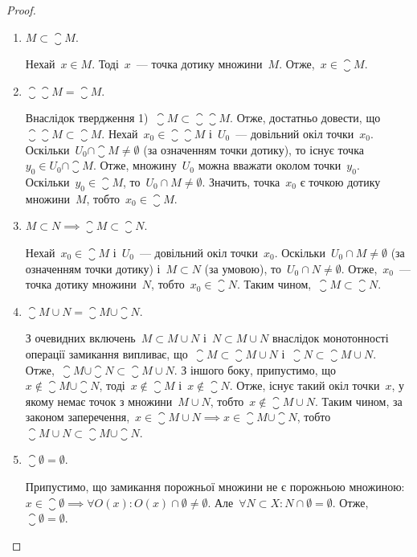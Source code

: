 \begin{proof}
    \listhack
    \begin{enumerate}
        \item $M \subset \closure M$.

        Нехай~$x \in M$. Тоді~$x$~--- точка дотику множини~$M$. Отже,~$x \in \closure M$.
        
        \item $\closure{\closure{M}} = \closure M$.
        
        Внаслідок твердження 1)~$\closure M \subset \closure{\closure{M}}$. Отже, достатньо довести, що~$\closure{\closure{M}} \subset \closure M$. Нехай~$x_0 \in \closure{\closure{M}}$ і~$U_0$~--- довільний окіл точки~$x_0$. Оскільки~$U_0 \cap \closure M \ne \emptyset$ (за означенням точки дотику), то існує точка~$y_0 \in U_0 \cap \closure M$. Отже, множину~$U_0$ можна вважати околом точки~$y_0$. Оскільки~$y_0 \in \closure M$, то~$U_0 \cap M \ne \emptyset$. Значить, точка~$x_0$ є точкою дотику множини~$M$, тобто~$x_0 \in \closure M$.
        
        \item $M \subset N \implies \closure M \subset \closure N$.
        
        Нехай~$x_0 \in \closure M$ і~$U_0$~--- довільний окіл точки~$x_0$. Оскільки~$U_0 \cap M \ne \emptyset$ (за означенням точки дотику) і~$M \subset N$ (за умовою), то~$U_0 \cap N \ne \emptyset$. Отже,~$x_0$~--- точка дотику множини~$N$, тобто~$x_0 \in \closure N$. Таким чином,~$\closure M \subset \closure N$.
        
        \item $\closure{M \cup N} = \closure M \cup \closure N$.
        
        З очевидних включень~$M \subset M \cup N$ і~$N \subset M \cup N$ внаслідок монотонності операції замикання випливає, що~$\closure M \subset \closure{M \cup N}$ і~$\closure N \subset \closure{M \cup N}$. Отже,~$\closure M \cup \closure N \subset \closure{M \cup N}$. З іншого боку, припустимо, що~$x \not\in \closure M \cup \closure N$, тоді~$x \not\in \closure M$ і~$x \not\in \closure N$. Отже, існує такий окіл точки~$x$, у якому немає точок з множини~$M \cup N$, тобто~$x \not\in \closure{M \cup N}$. Таким чином, за законом заперечення,~$x \in \closure{M \cup N} \implies x \in \closure M \cup \closure N$, тобто~$\closure{M \cup N} \subset \closure M \cup \closure N$.
        
        \item $\closure \emptyset = \emptyset$.
        
        Припустимо, що замикання порожньої множини не є порожньою множиною: $x \in \closure \emptyset \implies \forall O(x): O(x) \cap \emptyset \ne \emptyset$. Але~$\forall N \subset X: N \cap \emptyset = \emptyset$. Отже,~$\closure \emptyset = \emptyset$. \qedhere
    \end{enumerate}
\end{proof}

